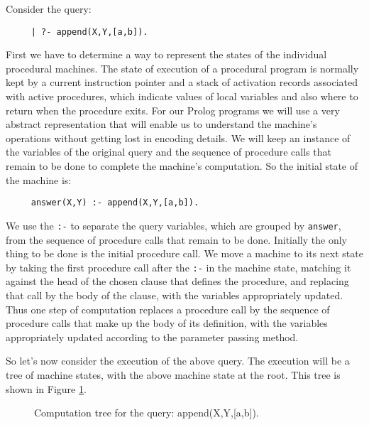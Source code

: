 Consider the query:
\begin{verbatim}
     | ?- append(X,Y,[a,b]).
\end{verbatim}
First we have to determine a way to represent the states of the
individual procedural machines.  The state of execution of a
procedural program is normally kept by a current instruction pointer
and a stack of activation records associated with active procedures,
which indicate values of local variables and also where to return when
the procedure exits.  For our Prolog programs we will use a very
abstract representation that will enable us to understand the
machine's operations without getting lost in encoding details.  We
will keep an instance of the variables of the original query and the
sequence of procedure calls that remain to be done to complete the
machine's computation.  So the initial state of the machine is:
\begin{verbatim}
     answer(X,Y) :- append(X,Y,[a,b]).
\end{verbatim}
We use the \verb|:-| to separate the query variables, which are
grouped by \verb|answer|, from the sequence of procedure calls that
remain to be done.  Initially the only thing to be done is the initial
procedure call.  We move a machine to its next state by taking the
first procedure call after the \verb|:-| in the machine state,
matching it against the head of the chosen clause that defines the
procedure, and replacing that call by the body of the clause, with the
variables appropriately updated.  Thus one step of computation
replaces a procedure call by the sequence of procedure calls that make
up the body of its definition, with the variables appropriately
updated according to the parameter passing method.

So let's now consider the execution of the above query.  The execution
will be a tree of machine states, with the above machine state at the
root.  This tree is shown in Figure \ref{appendsld}.
\begin{figure}
\centerline{}
\caption{Computation tree for the query: append(X,Y,[a,b]).}\label{appendsld}
\end{figure}

